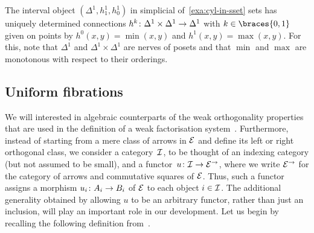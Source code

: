 \documentclass[reqno,10pt,a4paper,oneside,draft]{amsart}
\begin{document}

\begin{example}
The interval object $(\Delta^1, h_1^1, h_0^1)$ in simplicial of~\cref{exa:cyl-in-sset} sets has uniquely determined connections $h^k \co \Delta^1 \times \Delta^1 \to \Delta^1$ with $k \in \braces{0, 1}$ given on points by $h^0(x, y) = \min(x, y)$ and $h^1(x, y) = \max(x, y)$.
For this, note that $\Delta^1$ and $\Delta^1 \times \Delta^1$ are nerves of posets and that $\min$ and $\max$ are monotonous with respect to their orderings.
\end{example}

\begin{example} 
\end{example}

\subsection*{Uniform fibrations}
We will interested in algebraic counterparts of the weak orthogonality properties that are used in the definition of a weak factorisation system~\cite{bousfield-wfs}.
Furthermore, instead of starting from a mere class of arrows in $\catE$ and define its left or right orthogonal class, we consider a category~$\cal{I}$, to be thought of an indexing category (but not assumed to be small), and a functor~$u \co \cal{I} \to \catE^\to$, where we write $\catE^\to$ for the category of arrows and commutative squares of $\catE$.
Thus, such a functor assigns a morphism $u_i \co A_i \to B_i$ of $\catE$ to each object $i \in \cal{I}$.
The additional generality obtained by allowing $u$ to be an arbitrary functor, rather than just an inclusion, will play an important role in our development.
Let us begin by recalling the following definition from~\cite{garner:small-object-argument}.
\end{document}
